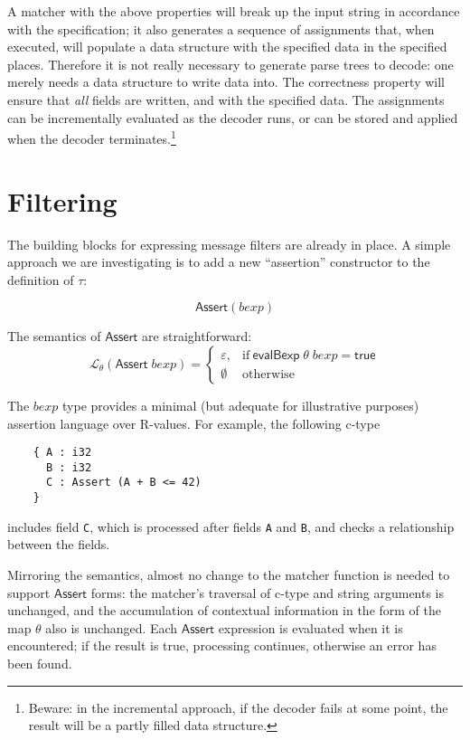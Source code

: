 \documentclass[svgnames]{llncs}
\newcommand{\konst}[1]{\ensuremath{\mathsf{#1}}}
\newcommand{\LangTheta}[1]{\ensuremath{{\mathcal L}_{\theta}({#1})}}
\begin{document}
A matcher with the above properties will break up the input string in
accordance with the specification; it also generates a sequence of
assignments that, when executed, will populate a data structure with
the specified data in the specified places. Therefore it is not really
necessary to generate parse trees to decode: one merely needs a data
structure to write data into. The correctness property will ensure
that \emph{all} fields are written, and with the specified data. The
assignments can be incrementally evaluated as the decoder runs, or can
be stored and applied when the decoder terminates.\footnote{Beware: in
  the incremental approach, if the decoder fails at some point, the
  result will be a partly filled data structure.}



\section{Filtering}

The building blocks for expressing message filters are already in
place. A simple approach we are investigating is to add a new
``assertion'' constructor to the definition of $\tau$:

\[
  \konst{Assert}(\mathit{bexp})
\]

\noindent The semantics of \konst{Assert} are straightforward:
\[
\LangTheta{\konst{Assert}\; \mathit{bexp}} =
 \left\{
    \begin{array}{ll}
    \varepsilon, &  \mathrm{if}\ \konst{evalBexp}\;\theta\;\mathit{bexp} = \konst{true} \\
    \emptyset & \mathrm{otherwise}
 \end{array}
 \right.
\]

The $\mathit{bexp}$ type provides a minimal (but adequate for
illustrative purposes) assertion language over R-values. For example,
the following c-type

\begin{verbatim}
    { A : i32
      B : i32
      C : Assert (A + B <= 42)
    }
\end{verbatim}

\noindent includes field \verb+C+, which is processed after fields
\verb+A+ and \verb+B+, and checks a relationship between the fields.

Mirroring the semantics, almost no change to the matcher function is
needed to support \konst{Assert} forms: the matcher's traversal of
c-type and string arguments is unchanged, and the accumulation of
contextual information in the form of the map $\theta$ also is
unchanged. Each \konst{Assert} expression is evaluated when it is
encountered; if the result is true, processing continues, otherwise
an error has been found.
\end{document}
